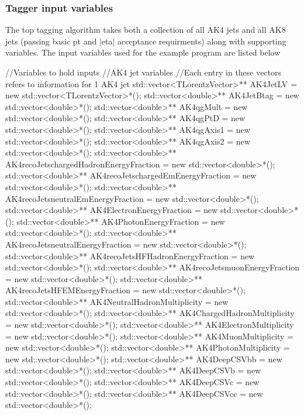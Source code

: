 \subsubsection*{Tagger input variables}

The top tagging algorithm takes both a collection of all A\-K4 jets and all A\-K8 jets (passing basic pt and $\vert$eta$\vert$ acceptance requirments) along with supporting variables. The input variables used for the example program are listed below


\begin{DoxyCode}
\textcolor{comment}{//Variables to hold inputs}
\textcolor{comment}{//AK4 jet variables}
\textcolor{comment}{//Each entry in these vectors refers to information for 1 AK4 jet}
std::vector<TLorentzVector>** AK4JetLV = \textcolor{keyword}{new} std::vector<TLorentzVector>*();
std::vector<double>** AK4JetBtag = \textcolor{keyword}{new} std::vector<double>*();
std::vector<double>** AK4qgMult = \textcolor{keyword}{new} std::vector<double>*();
std::vector<double>** AK4qgPtD = \textcolor{keyword}{new} std::vector<double>*();
std::vector<double>** AK4qgAxis1 = \textcolor{keyword}{new} std::vector<double>*();
std::vector<double>** AK4qgAxis2 = \textcolor{keyword}{new} std::vector<double>*();
std::vector<double>** AK4recoJetschargedHadronEnergyFraction = \textcolor{keyword}{new} std::vector<double>*();
std::vector<double>** AK4recoJetschargedEmEnergyFraction = \textcolor{keyword}{new} std::vector<double>*();
std::vector<double>** AK4recoJetsneutralEmEnergyFraction = \textcolor{keyword}{new} std::vector<double>*();
std::vector<double>** AK4ElectronEnergyFraction = \textcolor{keyword}{new} std::vector<double>*();
std::vector<double>** AK4PhotonEnergyFraction = \textcolor{keyword}{new} std::vector<double>*();
std::vector<double>** AK4recoJetsneutralEnergyFraction = \textcolor{keyword}{new} std::vector<double>*();
std::vector<double>** AK4recoJetsHFHadronEnergyFraction = \textcolor{keyword}{new} std::vector<double>*();
std::vector<double>** AK4recoJetsmuonEnergyFraction = \textcolor{keyword}{new} std::vector<double>*();
std::vector<double>** AK4recoJetsHFEMEnergyFraction = \textcolor{keyword}{new} std::vector<double>*();
std::vector<double>** AK4NeutralHadronMultiplicity = \textcolor{keyword}{new} std::vector<double>*();
std::vector<double>** AK4ChargedHadronMultiplicity = \textcolor{keyword}{new} std::vector<double>*();
std::vector<double>** AK4ElectronMultiplicity = \textcolor{keyword}{new} std::vector<double>*();
std::vector<double>** AK4MuonMultiplicity = \textcolor{keyword}{new} std::vector<double>*();
std::vector<double>** AK4PhotonMultiplicity = \textcolor{keyword}{new} std::vector<double>*();
std::vector<double>** AK4DeepCSVbb = \textcolor{keyword}{new} std::vector<double>*();
std::vector<double>** AK4DeepCSVb = \textcolor{keyword}{new} std::vector<double>*();
std::vector<double>** AK4DeepCSVc = \textcolor{keyword}{new} std::vector<double>*();
std::vector<double>** AK4DeepCSVcc = \textcolor{keyword}{new} std::vector<double>*();


\end{DoxyCode}
